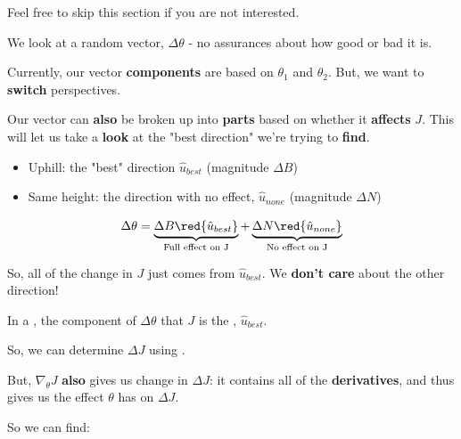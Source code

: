         Feel free to skip this section if you are not interested.
        
        We look at a random vector, $\Delta \theta$ - no assurances about how good or bad it is.
        
        Currently, our vector \textbf{components} are based on $\theta_1$ and $\theta_2$. But, we want to \textbf{switch} perspectives.
        
        Our vector can \textbf{also} be broken up into \textbf{parts} based on whether it \textbf{affects} $J$. This will let us take a \textbf{look} at the "best direction" we're trying to \textbf{find}.
        
        \begin{itemize}
            \item Uphill: the "best" direction $\hat{u}_{best}$ (magnitude $\Delta B$)
            
            \item Same height: the direction with no effect, $\hat{u}_{none}$ (magnitude $\Delta N$)
        \end{itemize}
        
        \begin{equation}
            \Delta \theta
            =
            \underbrace{
                \Delta B \red{ \hat{u}_{best} }
            }_{\text{Full effect on J}} 
            + 
            \underbrace{
                \Delta N \red{ \hat{u}_{none} }
            }_{ \text{No effect on J} } 
        \end{equation}
        
        So, all of the change in $J$ just comes from $\hat{u}_{best}$. We \textbf{don't care} about the other direction!\\
        
        \begin{concept}
            In a , the  component of $\Delta \theta$ that  $J$ is the , $\hat{u}_{best}$.
            
            So, we can determine $\Delta J$ using .
        \end{concept}
        
        But, $\nabla_{\theta} J$ \textbf{also} gives us change in $\Delta J$: it contains all of the \textbf{derivatives}, and thus gives us the effect $\theta$ has on $\Delta J$.
        
        So we can find:
        
